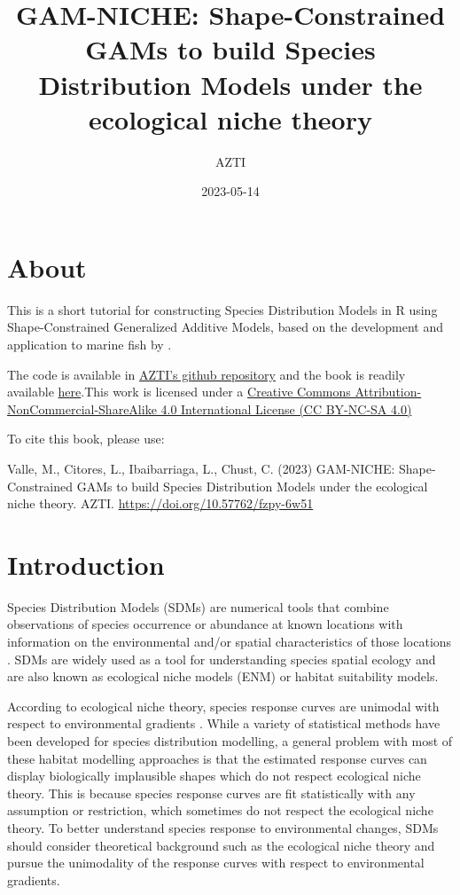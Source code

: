 \documentclass[
]{book}
\title{GAM-NICHE: Shape-Constrained GAMs to build Species Distribution Models under the ecological niche theory}
\author{AZTI}
\date{2023-05-14}
\begin{document}
\maketitle

{
\setcounter{tocdepth}{1}
\tableofcontents
}
\hypertarget{about}{%
\chapter*{About}\label{about}}

This is a short tutorial for constructing Species Distribution Models in R using Shape-Constrained Generalized Additive Models, based on the development and application to marine fish by \citet{citores_etal_2020}.

The code is available in \href{https://github.com/Fundacion-AZTI/gam-niche}{AZTI's github repository} and the book is readily available \href{https://fundacion-azti.github.io/gam-niche/}{here}.This work is licensed under a \href{https://creativecommons.org/licenses/by-nc-sa/4.0/}{Creative Commons Attribution-NonCommercial-ShareAlike 4.0 International License (CC BY-NC-SA 4.0)}

To cite this book, please use:

Valle, M., Citores, L., Ibaibarriaga, L., Chust, C. (2023) GAM-NICHE: Shape-Constrained GAMs to build Species Distribution Models under the ecological niche theory. AZTI. \url{https://doi.org/10.57762/fzpy-6w51}

\hypertarget{introduction}{%
\chapter{Introduction}\label{introduction}}

Species Distribution Models (SDMs) are numerical tools that combine observations of species occurrence or abundance at known locations with information on the environmental and/or spatial characteristics of those locations \citep{elith_etal_2009}. SDMs are widely used as a tool for understanding species spatial ecology and are also known as ecological niche models (ENM) or habitat suitability models.

According to ecological niche theory, species response curves are unimodal with respect to environmental gradients \citep{hutchinson_1957}. While a variety of statistical methods have been developed for species distribution modelling, a general problem with most of these habitat modelling approaches is that the estimated response curves can display biologically implausible shapes which do not respect ecological niche theory. This is because species response curves are fit statistically with any assumption or restriction, which sometimes do not respect the ecological niche theory. To better understand species response to environmental changes, SDMs should consider theoretical background such as the ecological niche theory and pursue the unimodality of the response curves with respect to environmental gradients.
\end{document}
